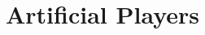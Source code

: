 \documentclass[12pt,a4paper,twoside,openright]{book}
\begin{document}


\chapter{Artificial Players}
\label{ch:ai}










\end{document}
